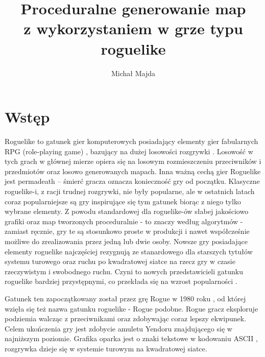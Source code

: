 \documentclass[12pt,twoside]{article}
\author{Michał Majda}
\title{Proceduralne generowanie map \\ z wykorzystaniem w grze typu roguelike }
\begin{document}
\maketitle

\blankpage
\tableofcontents
\clearpage
\blankpage


%

\section*{Wstęp}
Roguelike to gatunek gier komputerowych posiadający elementy gier fabularnych RPG (role-playing game) \cite{book_rpg}, bazujący na dużej losowości rozgrywki \cite{bookroguelike}. Losowość w tych grach w głównej mierze opiera się na losowym rozmieszczeniu przeciwników i przedmiotów oraz losowo generowanych mapach. Inna ważną cechą gier Roguelike jest permadeath -- śmierć gracza oznacza konieczność gry od początku. Klasyczne roguelike-i, z racji trudnej rozgrywki, nie były popularne, ale w ostatnich latach coraz popularniejsze są gry inspirujące się tym gatunek biorąc z niego tylko wybrane elementy. Z powodu standardowej dla roguelike-ów słabej jakościowo grafiki oraz map tworzonych proceduralnie - to znaczy według algorytmów - zamiast ręcznie, gry te są stosunkowo proste w produkcji i nawet współcześnie możliwe do zrealizowania przez jedną lub dwie osoby. Nowsze gry posiadające elementy roguelike najczęściej rezygnują ze stanardowego dla starszych tytułów systemu turowego oraz ruchu po kwadratowej siatce na rzecz gry w czasie rzeczywistym i swobodnego ruchu. Czyni to nowych przedstawicieli gatunku roguelike bardziej przystępnymi, co przekłada się na wzrost popularności \cite{roguelike_popularity}.

Gatunek ten zapoczątkowany został przez grę Rogue w 1980 roku \cite{rogue_game}, od której wzięła się też nazwa gatunku roguelike - Rogue podobne. Rogue gracz eksploruje podziemia walcząc z przeciwnikami oraz zdobywając coraz lepszy ekwipunek. Celem ukończenia gry jest zdobycie amuletu Yendoru znajdującego się w najniższym poziomie. Grafika oparka jest o znaki tekstowe w kodowaniu ASCII \cite{book_ascii}, rozgrywka dzieje się w systemie turowym na kwadratowej siatce.
\end{document}
